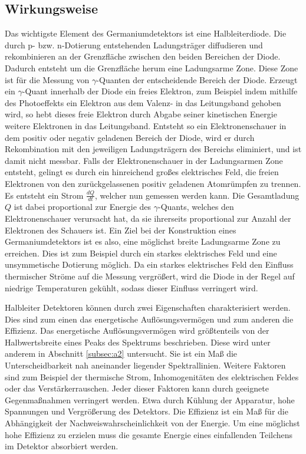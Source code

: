 \subsection{Wirkungsweise}
\label{subsec:Wirkungsweise}
Das wichtigste Element des Germaniumdetektors ist eine Halbleiterdiode.
Die durch p- bzw. n-Dotierung entstehenden Ladungsträger diffudieren und rekombinieren an der Grenzfläche zwischen den beiden Bereichen der Diode. 
Dadurch entsteht um die Grenzfläche herum eine Ladungsarme Zone.
Diese Zone ist für die Messung von $\gamma$-Quanten der entscheidende Bereich der Diode.
Erzeugt ein $\gamma$-Quant innerhalb der Diode ein freies Elektron, zum Beispiel indem mithilfe des Photoeffekts ein Elektron aus dem Valenz- in das Leitungsband gehoben wird, so hebt dieses freie Elektron durch Abgabe seiner kinetischen Energie weitere Elektronen in das Leitungsband.
Entsteht so ein Elektronenschauer in dem positiv oder negativ geladenen Bereich der Diode, wird er durch Rekombination mit den jeweiligen Ladungsträgern des Bereichs eliminiert, und ist damit nicht messbar.
Falls der Elektronenschauer in der Ladungsarmen Zone entsteht, gelingt es durch ein hinreichend großes elektrisches Feld, die freien Elektronen von den zurückgelassenen positiv geladenen Atomrümpfen zu trennen. 
Es entsteht ein Strom $\frac{dQ}{dt}$, welcher nun gemessen werden kann.
Die Gesamtladung $Q$ ist dabei proportional zur Energie des $\gamma$-Quants, welches den Elektronenschauer verursacht hat, da sie ihrerseits proportional zur Anzahl der Elektronen des Schauers ist.
Ein Ziel bei der Konstruktion eines Germaniumdetektors ist es also, eine möglichst breite Ladungsarme Zone zu erreichen.
Dies ist zum Beispiel durch ein starkes elektrisches Feld und eine unsymmetische Dotierung möglich.
Da ein starkes elektrisches Feld den Einfluss thermischer Ströme auf die Messung vergrößert, wird die Diode in der Regel auf niedrige Temperaturen gekühlt, sodass dieser Einfluss verringert wird.

Halbleiter Detektoren können durch zwei Eigenschaften charakterisiert werden.
Dies sind zum einen das energetische Auflösungsvermögen und zum anderen die Effizienz.
Das energetische Auflösungsvermögen wird größtenteils von der Halbwertsbreite eines Peaks des Spektrums beschrieben. 
Diese wird unter anderem in Abschnitt \ref{subsec:a2} untersucht.
Sie ist ein Maß die Unterscheidbarkeit nah aneinander liegender Spektrallinien.
Weitere Faktoren sind zum Beispiel der thermische Strom, Inhomogenitäten des elektrischen Feldes oder das Verstärkerrauschen.
Jeder dieser Faktoren kann durch geeignete Gegenmaßnahmen verringert werden. 
Etwa durch Kühlung der Apparatur, hohe Spannungen und Vergrößerung des Detektors.
Die Effizienz ist ein Maß für die Abhängigkeit der Nachweiswahrscheinlichkeit von der Energie.
Um eine möglichst hohe Effizienz zu erzielen muss die gesamte Energie eines einfallenden Teilchens im Detektor absorbiert werden.

